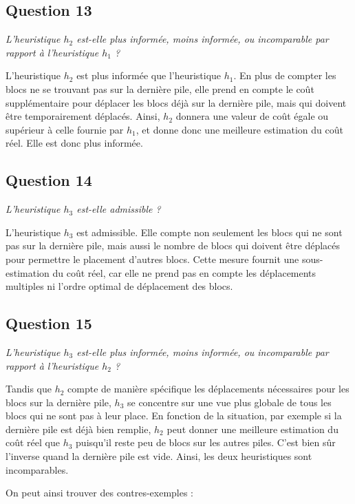 \subsection{Question 13}

\textit{L'heuristique $h_2$ est-elle plus informée, moins informée, ou incomparable par rapport à l'heuristique $h_1$ ?}

L'heuristique $h_2$ est plus informée que l'heuristique $h_1$. En plus de compter les blocs ne se trouvant pas sur la dernière pile, elle prend en compte le coût supplémentaire pour déplacer les blocs déjà sur la dernière pile, mais qui doivent être temporairement déplacés. Ainsi, $h_2$ donnera une valeur de coût égale ou supérieur à celle fournie par $h_1$, et donne donc une meilleure estimation du coût réel. Elle est donc plus informée.

\subsection{Question 14}

\textit{L'heuristique $h_3$ est-elle admissible ?}

L'heuristique $h_3$ est admissible. Elle compte non seulement les blocs qui ne sont pas sur la dernière pile, mais aussi le nombre de blocs qui doivent être déplacés pour permettre le placement d'autres blocs. Cette mesure fournit une sous-estimation du coût réel, car elle ne prend pas en compte les déplacements multiples ni l'ordre optimal de déplacement des blocs.

\subsection{Question 15}

\textit{L'heuristique $h_3$ est-elle plus informée, moins informée, ou incomparable par rapport à l'heuristique $h_2$ ?}

Tandis que $h_2$ compte de manière spécifique les déplacements nécessaires pour les blocs sur la dernière pile, $h_3$ se concentre sur une vue plus globale de tous les blocs qui ne sont pas à leur place. En fonction de la situation, par exemple si la dernière pile est déjà bien remplie, $h_2$ peut donner une meilleure estimation du coût réel que $h_3$ puisqu'il reste peu de blocs sur les autres piles. C'est bien sûr l'inverse quand la dernière pile est vide. Ainsi, les deux heuristiques sont incomparables.

On peut ainsi trouver des contres-exemples :

